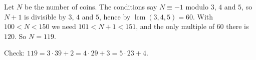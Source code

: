 Let $N$ be the number of coins. The conditions say $N\equiv-1$ modulo $3$, $4$ and $5$, so $N+1$ is divisible by $3$, $4$ and $5$, hence by $\operatorname{lcm}(3,4,5)=60$. With $100<N<150$ we need $101<N+1<151$, and the only multiple of $60$ there is $120$. So $N=\boxed{119}$.

Check: $119=3\cdot39+2=4\cdot29+3=5\cdot23+4$.
